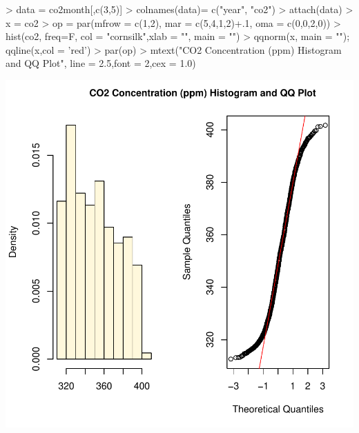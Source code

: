 \documentclass[11pt, a4paper]{article} %
\begin{document}
\begin{Schunk}
\begin{Sinput}
> data = co2month[,c(3,5)]
> colnames(data)= c("year", "co2")
> attach(data)
> x = co2
> op = par(mfrow = c(1,2),
 mar = c(5,4,1,2)+.1,
 oma = c(0,0,2,0))
> hist(co2, freq=F, col = "cornsilk",xlab = "", main = "")
> qqnorm(x, main = ""); qqline(x,col = 'red')
> par(op)
> mtext("CO2 Concentration (ppm) Histogram and QQ Plot", line = 2.5,font = 2,cex = 1.0)
\end{Sinput}
\end{Schunk}
\includegraphics{alles-fig1check}
\end{document}
